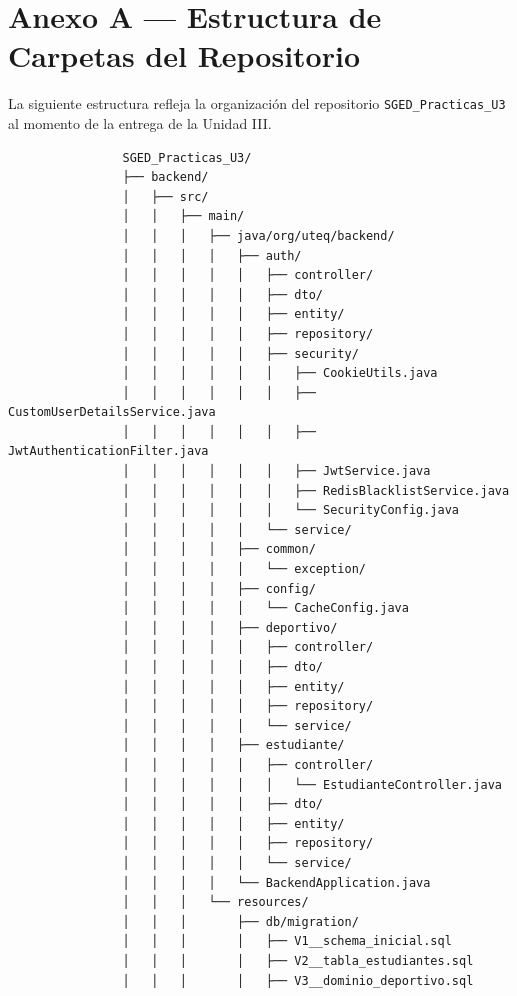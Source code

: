 \documentclass[12pt]{article}
\begin{document}
	\newpage
	
	\section*{Anexo A — Estructura de Carpetas del Repositorio}
	
	La siguiente estructura refleja la organización del repositorio \texttt{SGED\_Practicas\_U3} al momento de la entrega de la Unidad III.
	
	\begin{mdframed}[linecolor=gray!40, backgroundcolor=gray!5, linewidth=1pt]
		\begin{ttfamily}\footnotesize
			\begin{verbatim}
				SGED_Practicas_U3/
				├── backend/
				│   ├── src/
				│   │   ├── main/
				│   │   │   ├── java/org/uteq/backend/
				│   │   │   │   ├── auth/
				│   │   │   │   │   ├── controller/
				│   │   │   │   │   ├── dto/
				│   │   │   │   │   ├── entity/
				│   │   │   │   │   ├── repository/
				│   │   │   │   │   ├── security/
				│   │   │   │   │   │   ├── CookieUtils.java
				│   │   │   │   │   │   ├── CustomUserDetailsService.java
				│   │   │   │   │   │   ├── JwtAuthenticationFilter.java
				│   │   │   │   │   │   ├── JwtService.java
				│   │   │   │   │   │   ├── RedisBlacklistService.java
				│   │   │   │   │   │   └── SecurityConfig.java
				│   │   │   │   │   └── service/
				│   │   │   │   ├── common/
				│   │   │   │   │   └── exception/
				│   │   │   │   ├── config/
				│   │   │   │   │   └── CacheConfig.java
				│   │   │   │   ├── deportivo/
				│   │   │   │   │   ├── controller/
				│   │   │   │   │   ├── dto/
				│   │   │   │   │   ├── entity/
				│   │   │   │   │   ├── repository/
				│   │   │   │   │   └── service/
				│   │   │   │   ├── estudiante/
				│   │   │   │   │   ├── controller/
				│   │   │   │   │   │   └── EstudianteController.java
				│   │   │   │   │   ├── dto/
				│   │   │   │   │   ├── entity/
				│   │   │   │   │   ├── repository/
				│   │   │   │   │   └── service/
				│   │   │   │   └── BackendApplication.java
				│   │   │   └── resources/
				│   │   │       ├── db/migration/
				│   │   │       │   ├── V1__schema_inicial.sql
				│   │   │       │   ├── V2__tabla_estudiantes.sql
				│   │   │       │   ├── V3__dominio_deportivo.sql

\end{verbatim}
\end{ttfamily}
\end{mdframed}
\end{document}
